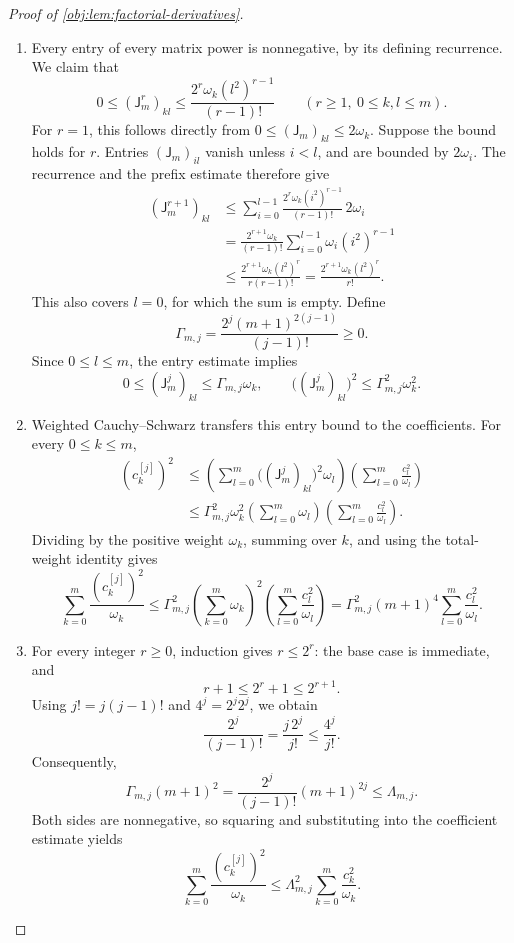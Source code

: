 \begin{proof}[Proof of \cref{obj:lem:factorial-derivatives}]
\begin{enumerate}
\item Every entry of every matrix power is nonnegative, by its defining recurrence. We claim that
\[
0\le(\mathsf J_m^r)_{kl}
\le
\frac{2^r\omega_k(l^2)^{r-1}}{(r-1)!}
\qquad(r\ge1,\ 0\le k,l\le m).
\]
For \(r=1\), this follows directly from
\(0\le(\mathsf J_m)_{kl}\le2\omega_k\).
Suppose the bound holds for \(r\). Entries \((\mathsf J_m)_{il}\) vanish unless \(i<l\), and are bounded by \(2\omega_i\). The recurrence and the prefix estimate therefore give
\[
\begin{aligned}
(\mathsf J_m^{r+1})_{kl}
&\le
\sum_{i=0}^{l-1}
\frac{2^r\omega_k(i^2)^{r-1}}{(r-1)!}\,2\omega_i\\
&=
\frac{2^{r+1}\omega_k}{(r-1)!}
\sum_{i=0}^{l-1}\omega_i(i^2)^{r-1}\\
&\le
\frac{2^{r+1}\omega_k(l^2)^r}{r(r-1)!}
=
\frac{2^{r+1}\omega_k(l^2)^r}{r!}.
\end{aligned}
\]
This also covers \(l=0\), for which the sum is empty. Define
\[
\Gamma_{m,j}
=
\frac{2^j(m+1)^{2(j-1)}}{(j-1)!}\ge0.
\]
Since \(0\le l\le m\), the entry estimate implies
\[
0\le(\mathsf J_m^j)_{kl}\le\Gamma_{m,j}\omega_k,
\qquad
\bigl((\mathsf J_m^j)_{kl}\bigr)^2
\le
\Gamma_{m,j}^2\omega_k^2.
\]

\item Weighted Cauchy--Schwarz transfers this entry bound to the coefficients. For every \(0\le k\le m\),
\[
\begin{aligned}
(c_k^{[j]})^2
&\le
\left(\sum_{l=0}^m
\bigl((\mathsf J_m^j)_{kl}\bigr)^2\omega_l\right)
\left(\sum_{l=0}^m\frac{c_l^2}{\omega_l}\right)\\
&\le
\Gamma_{m,j}^2\omega_k^2
\left(\sum_{l=0}^m\omega_l\right)
\left(\sum_{l=0}^m\frac{c_l^2}{\omega_l}\right).
\end{aligned}
\]
Dividing by the positive weight \(\omega_k\), summing over \(k\), and using the total-weight identity gives
\[
\sum_{k=0}^m\frac{(c_k^{[j]})^2}{\omega_k}
\le
\Gamma_{m,j}^2
\left(\sum_{k=0}^m\omega_k\right)^2
\left(\sum_{l=0}^m\frac{c_l^2}{\omega_l}\right)
=
\Gamma_{m,j}^2(m+1)^4
\sum_{l=0}^m\frac{c_l^2}{\omega_l}.
\]

\item For every integer \(r\ge0\), induction gives \(r\le2^r\): the base case is immediate, and
\[
r+1\le2^r+1\le2^{r+1}.
\]
Using \(j!=j(j-1)!\) and \(4^j=2^j2^j\), we obtain
\[
\frac{2^j}{(j-1)!}
=
\frac{j\,2^j}{j!}
\le
\frac{4^j}{j!}.
\]
Consequently,
\[
\Gamma_{m,j}(m+1)^2
=
\frac{2^j}{(j-1)!}(m+1)^{2j}
\le
\Lambda_{m,j}.
\]
Both sides are nonnegative, so squaring and substituting into the coefficient estimate yields
\[
\sum_{k=0}^m\frac{(c_k^{[j]})^2}{\omega_k}
\le
\Lambda_{m,j}^2
\sum_{k=0}^m\frac{c_k^2}{\omega_k}.
\]


\end{enumerate}
\end{proof}
